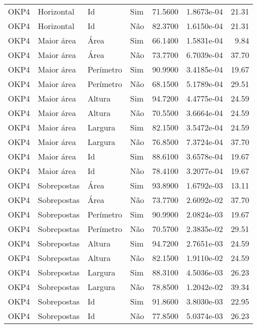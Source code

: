 \begin{tabular}{llllrrr}
    OKP4      & Horizontal  & Id        & Sim         & 71.5600      & 1.8673e-04 & 21.31    \\
    OKP4      & Horizontal  & Id        & Não         & 82.3700      & 1.6150e-04 & 21.31    \\
    OKP4      & Maior área  & Área      & Sim         & 66.1400      & 1.5831e-04 & 9.84     \\
    OKP4      & Maior área  & Área      & Não         & 73.7700      & 6.7039e-04 & 37.70    \\
    OKP4      & Maior área  & Perímetro & Sim         & 90.9900      & 3.4185e-04 & 19.67    \\
    OKP4      & Maior área  & Perímetro & Não         & 68.1500      & 5.1789e-04 & 29.51    \\
    OKP4      & Maior área  & Altura    & Sim         & 94.7200      & 4.4775e-04 & 24.59    \\
    OKP4      & Maior área  & Altura    & Não         & 70.5500      & 3.6664e-04 & 24.59    \\
    OKP4      & Maior área  & Largura   & Sim         & 82.1500      & 3.5472e-04 & 24.59    \\
    OKP4      & Maior área  & Largura   & Não         & 76.8500      & 7.3724e-04 & 37.70    \\
    OKP4      & Maior área  & Id        & Sim         & 88.6100      & 3.6578e-04 & 19.67    \\
    OKP4      & Maior área  & Id        & Não         & 78.4100      & 3.2077e-04 & 19.67    \\
    OKP4      & Sobrepostas & Área      & Sim         & 93.8900      & 1.6792e-03 & 13.11    \\
    OKP4      & Sobrepostas & Área      & Não         & 73.7700      & 2.6092e-02 & 37.70    \\
    OKP4      & Sobrepostas & Perímetro & Sim         & 90.9900      & 2.0824e-03 & 19.67    \\
    OKP4      & Sobrepostas & Perímetro & Não         & 70.5700      & 2.3835e-02 & 29.51    \\
    OKP4      & Sobrepostas & Altura    & Sim         & 94.7200      & 2.7651e-03 & 24.59    \\
    OKP4      & Sobrepostas & Altura    & Não         & 82.1500      & 1.9110e-02 & 24.59    \\
    OKP4      & Sobrepostas & Largura   & Sim         & 88.3100      & 4.5036e-03 & 26.23    \\
    OKP4      & Sobrepostas & Largura   & Não         & 78.8500      & 1.2042e-02 & 39.34    \\
    OKP4      & Sobrepostas & Id        & Sim         & 91.8600      & 3.8030e-03 & 22.95    \\
    OKP4      & Sobrepostas & Id        & Não         & 77.8500      & 5.0374e-03 & 26.23    \\
    \hline
\end{tabular}